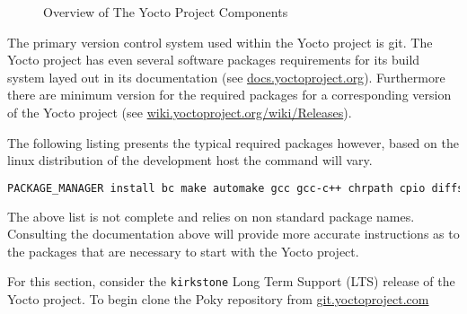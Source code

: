 \begin{figure}[h]
	\caption{Overview of The Yocto Project Components}
	\label{fig:yocto-overview}
\end{figure}

The primary version control system used within the Yocto project is git. The Yocto project has even several software packages requirements for its build system layed out in its documentation (see \href{https://docs.yoctoproject.org/}{docs.yoctoproject.org}). Furthermore there are minimum version for the required packages for a corresponding version of the Yocto project (see \href{https://wiki.yoctoproject.org/wiki/Releases}{wiki.yoctoproject.org/wiki/Releases}).

The following listing presents the typical required packages however, based on the linux distribution of the development host the command will vary.

\begin{lstlisting}[language=Bash]
	PACKAGE_MANAGER install bc make automake gcc gcc-c++ chrpath cpio diffstat gawk git python texinfo wget
\end{lstlisting}

The above list is not complete and relies on non standard package names. Consulting the documentation above will provide more accurate instructions as to the packages that are necessary to start with the Yocto project.

For this section, consider the \texttt{kirkstone} Long Term Support (LTS) release of the Yocto project. To begin clone the Poky repository from \href{https://git.yoctoproject.com}{git.yoctoproject.com}

